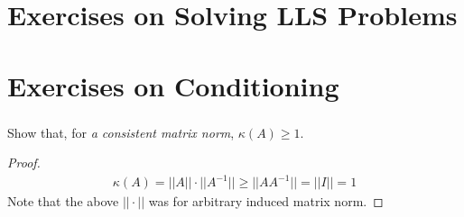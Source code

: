 \documentclass[11pt,a4paper]{article}
\begin{document}
\begin{titlepage}
    \maketitle
\end{titlepage}
\begin{center} 
    \tableofcontents  
%
\end{center}
\newpage
\part{Exercises on Solving LLS Problems}
\setcounter{section}{1}
\section{}

\section{}

\section{}

\newpage
\part{Exercises on Conditioning}
\setcounter{section}{0}
\section{}
Show that, for {\it a consistent matrix norm}, $\kappa(A) \geq 1$.

\begin{proof}
\begin{align}
    \kappa(A) = ||A|| \cdot ||A^{-1}|| \geq || A A^{-1}|| = ||I|| = 1
\end{align}
Note that the above $||\cdot||$ was for arbitrary induced matrix norm.
\end{proof}
\end{document}
